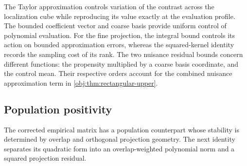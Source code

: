The Taylor approximation controls variation of the contrast across the localization cube while reproducing its value exactly at the evaluation profile. The bounded coefficient vector and coarse basis provide uniform control of polynomial evaluation. For the fine projection, the integral bound controls its action on bounded approximation errors, whereas the squared-kernel identity records the sampling cost of its rank. The two nuisance residual bounds concern different functions: the propensity multiplied by a coarse basis coordinate, and the control mean. Their respective orders account for the combined nuisance approximation term in \cref{obj:thm:rectangular-upper}.

\subsection{Population positivity}

The corrected empirical matrix has a population counterpart whose stability is determined by overlap and orthogonal projection geometry. The next identity separates its quadratic form into an overlap-weighted polynomial norm and a squared projection residual.


